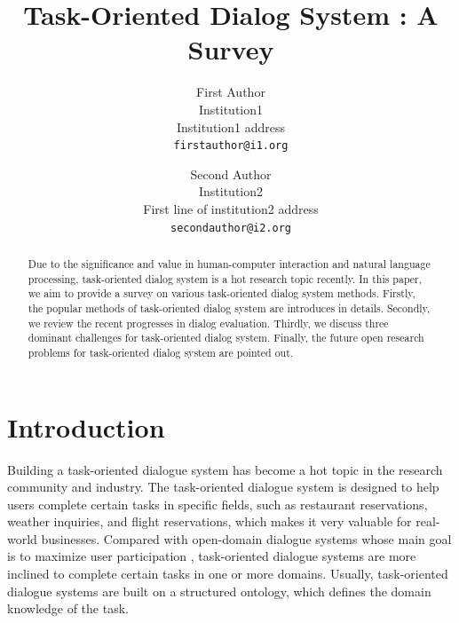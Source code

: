 \documentclass[10pt,twocolumn,letterpaper]{article}
\begin{document}
\title{Task-Oriented Dialog System : A Survey}

\author{First Author\\
Institution1\\
Institution1 address\\
{\tt\small firstauthor@i1.org}
\and
Second Author\\
Institution2\\
First line of institution2 address\\
{\tt\small secondauthor@i2.org}
}
\maketitle

\begin{abstract}
Due to the significance and value in human-computer interaction and natural language processing, task-oriented dialog system is a hot research topic recently. In this paper, we aim to provide a survey on various task-oriented dialog system methods. Firstly, the popular methods of task-oriented dialog system are introduces in details. Secondly, we review the recent progresses in dialog evaluation. Thirdly, we discuss three dominant challenges for task-oriented dialog system. Finally, the future open research problems for task-oriented dialog system are pointed out.

\end{abstract}

\section{Introduction}
\label{sec:intro}

Building a task-oriented dialogue system has become a hot topic in the research community and industry. The task-oriented dialogue system is designed to help users complete certain tasks in specific fields, such as restaurant reservations, weather inquiries, and flight reservations, which makes it very valuable for real-world businesses. Compared with open-domain dialogue systems whose main goal is to maximize user participation \cite{huang2020challenges}, task-oriented dialogue systems are more inclined to complete certain tasks in one or more domains. Usually, task-oriented dialogue systems are built on a structured ontology, which defines the domain knowledge of the task.
\end{document}
